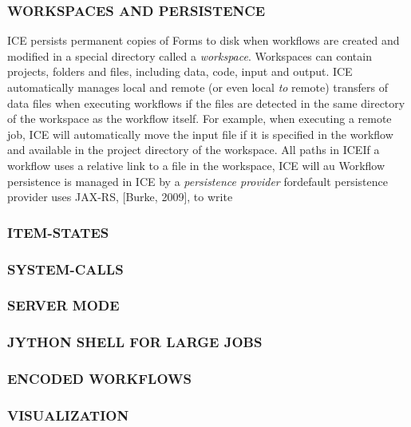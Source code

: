 \subsubsection{WORKSPACES AND
PERSISTENCE}\label{workspaces-and-persistence}

ICE persists permanent copies of Forms to disk when workflows are
created and modified in a special directory called a \emph{workspace}.
Workspaces can contain projects, folders and files, including data,
code, input and output. ICE automatically manages local and remote (or
even local \emph{to} remote) transfers of data files when executing
workflows if the files are detected in the same directory of the
workspace as the workflow itself. For example, when executing a remote
job, ICE will automatically move the input file if it is specified in
the workflow and available in the project directory of the workspace.
All paths in ICEIf a workflow uses a relative link to a file in the
workspace, ICE will au Workflow persistence is managed in ICE by a
\emph{persistence provider} fordefault persistence provider uses JAX-RS,
{[}Burke, 2009{]}, to write

\subsubsection{ITEM-STATES}\label{item-states}

\subsubsection{SYSTEM-CALLS}\label{system-calls}

\subsubsection{SERVER MODE}\label{server-mode}

\subsubsection{JYTHON SHELL FOR LARGE
JOBS}\label{jython-shell-for-large-jobs}

\subsubsection{ENCODED WORKFLOWS}\label{encoded-workflows}

\subsubsection{VISUALIZATION}\label{visualization}

